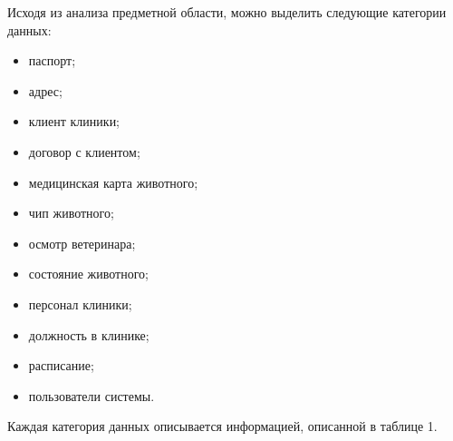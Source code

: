 \documentclass[a4paper,14pt]{article}
\begin{document}
Исходя из анализа предметной области, можно выделить следующие категории данных:

\begin{itemize}
	\item паспорт;
	\item адрес;
	\item клиент клиники;
	\item договор с клиентом;
	\item медицинская карта животного;
	\item чип животного;
	\item осмотр ветеринара;
	\item состояние животного;
	\item персонал клиники;
	\item должность в клинике;
	\item расписание;
	\item пользователи системы.
\end{itemize}

Каждая категория данных описывается информацией, описанной в таблице 1.
\end{document}
